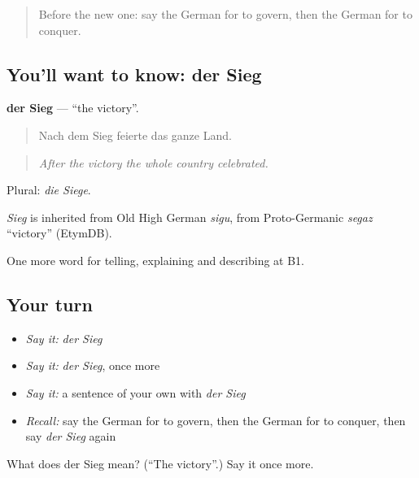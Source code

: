 \label{lesson:GE-C319-sieg}



\begin{quote}
Before the new one: say the German for to govern, then the German for to conquer.
\end{quote}

\subsection*{You'll want to know: der Sieg}
\textbf{der Sieg} — \textquotedblleft{}the victory\textquotedblright{}.

\begin{quote}
Nach dem Sieg feierte das ganze Land.
\end{quote}

\begin{quote}
\emph{After the victory the whole country celebrated.}
\end{quote}

Plural: \emph{die Siege}.

\begin{cousinweb}
\emph{Sieg} is inherited from Old High German \emph{sigu}, from Proto-Germanic \emph{segaz} \textquotedblleft{}victory\textquotedblright{} (EtymDB).
\end{cousinweb}

\begin{grammarlens}[title={What you've built}]
One more word for telling, explaining and describing at B1.
\end{grammarlens}

\subsection*{Your turn}
\begin{itemize}
\raggedright
  \item \emph{Say it:} \emph{der Sieg}
  \item \emph{Say it:} \emph{der Sieg}, once more
  \item \emph{Say it:} a sentence of your own with \emph{der Sieg}
  \item \emph{Recall:} say the German for to govern, then the German for to conquer, then say \emph{der Sieg} again
\end{itemize}

\begin{tcolorbox}[breakable,colback=teal!4,colframe=teal!35!black,title={Before you move on}]
What does der Sieg mean? (\textquotedblleft{}The victory\textquotedblright{}.) Say it once more.
\end{tcolorbox}
